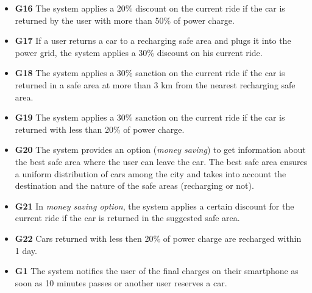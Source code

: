 \begin{itemize}
				\item \textbf{G16} The system applies a 20\% discount on the current ride if the car is returned by the user with more than 50\% of power charge.
				\item \textbf{G17} If a user returns a car to a recharging safe area and plugs it into the power grid, the system applies a 30\% discount on his current ride.
				\item \textbf{G18} The system applies a 30\% sanction on the current ride if the car is returned in a safe area at more than 3 km from the nearest recharging safe area.
				\item \textbf{G19} The system applies a 30\% sanction on the current ride if the car is returned with less than 20\% of power charge.
				\item \textbf{G20} The system provides an option (\textit{money saving}) to get information about the best safe area where the user can leave the car. The best safe area ensures a uniform distribution of cars among the city and takes into account the destination and the nature of the safe areas (recharging or not). %
				\item \textbf{G21} In \textit{money saving option}, the system applies a certain discount for the current ride if the car is returned in the suggested safe area. %
				\item \textbf{G22} Cars returned with less then 20\% of power charge are recharged within 1 day. %
				
				
				\item \textbf{G1} The system notifies the user of the final charges on their smartphone as soon as 10 minutes passes or another user reserves a car. %
			\end{itemize}